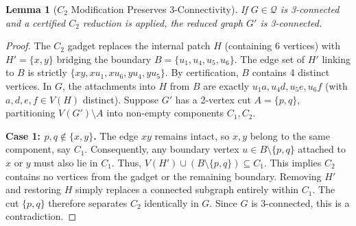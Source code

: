 \documentclass[12pt]{article}
\newtheorem{lemma}[theorem]{Lemma}
\begin{document}
\begin{lemma}[$C_2$ Modification Preserves 3-Connectivity]
\label{lem:app-c2-3conn}
If $G \in \mathcal{Q}$ is 3-connected and a certified $C_2$ reduction is applied, the reduced graph $G'$ is 3-connected.
\end{lemma}
\begin{proof}
The $C_2$ gadget replaces the internal patch $H$ (containing 6 vertices) with $H' = \{x, y\}$ bridging the boundary $B = \{u_1, u_4, u_5, u_6\}$. The edge set of $H'$ linking to $B$ is strictly $\{xy, xu_1, xu_6, yu_4, yu_5\}$. By certification, $B$ contains 4 distinct vertices. In $G$, the attachments into $H$ from $B$ are exactly $u_1a, u_4d, u_5e, u_6f$ (with $a, d, e, f \in V(H)$ distinct).
Suppose $G'$ has a 2-vertex cut $A = \{p, q\}$, partitioning $V(G') \setminus A$ into non-empty components $C_1, C_2$.

\textbf{Case 1: $p, q \notin \{x, y\}$.}
The edge $xy$ remains intact, so $x, y$ belong to the same component, say $C_1$.
Consequently, any boundary vertex $u \in B \setminus \{p, q\}$ attached to $x$ or $y$ must also lie in $C_1$. Thus, $V(H') \cup (B \setminus \{p, q\}) \subseteq C_1$. This implies $C_2$ contains no vertices from the gadget or the remaining boundary. Removing $H'$ and restoring $H$ simply replaces a connected subgraph entirely within $C_1$. The cut $\{p, q\}$ therefore separates $C_2$ identically in $G$. Since $G$ is 3-connected, this is a contradiction.


\end{proof}
\end{document}
